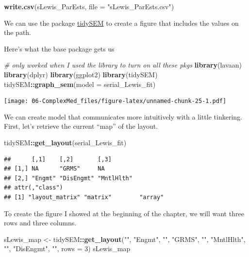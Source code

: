 \documentclass[
  11pt,
]{book}
\newenvironment{Shaded}{\begin{snugshade}}{\end{snugshade}}
\newcommand{\AttributeTok}[1]{\textcolor[rgb]{0.27,0.27,0.27}{#1}}
\newcommand{\CommentTok}[1]{\textcolor[rgb]{0.37,0.37,0.37}{\textit{#1}}}
\newcommand{\DecValTok}[1]{\textcolor[rgb]{0.06,0.06,0.06}{#1}}
\newcommand{\FunctionTok}[1]{\textcolor[rgb]{0.27,0.27,0.27}{\textbf{#1}}}
\newcommand{\NormalTok}[1]{#1}
\newcommand{\OtherTok}[1]{\textcolor[rgb]{0.37,0.37,0.37}{#1}}
\newcommand{\SpecialCharTok}[1]{\textcolor[rgb]{0.43,0.43,0.43}{\textbf{#1}}}
\newcommand{\StringTok}[1]{\textcolor[rgb]{0.5,0.5,0.5}{#1}}
\begin{document}
\begin{Shaded}
\begin{Highlighting}[]
\FunctionTok{write.csv}\NormalTok{(sLewis\_ParEsts, }\AttributeTok{file =} \StringTok{"sLewis\_ParEsts.csv"}\NormalTok{)}
\end{Highlighting}
\end{Shaded}

We can use the package \href{https://cjvanlissa.github.io/tidySEM/articles/Plotting_graphs.html}{tidySEM} to create a figure that includes the values on the path.

Here's what the base package gets us

\begin{Shaded}
\begin{Highlighting}[]
\CommentTok{\# only worked when I used the library to turn on all these pkgs}
\FunctionTok{library}\NormalTok{(lavaan)}
\FunctionTok{library}\NormalTok{(dplyr)}
\FunctionTok{library}\NormalTok{(ggplot2)}
\FunctionTok{library}\NormalTok{(tidySEM)}
\NormalTok{tidySEM}\SpecialCharTok{::}\FunctionTok{graph\_sem}\NormalTok{(}\AttributeTok{model =}\NormalTok{ serial\_Lewis\_fit)}
\end{Highlighting}
\end{Shaded}

\texttt{[image: 06-ComplexMed\_files/figure-latex/unnamed-chunk-25-1.pdf]}

We can create model that communicates more intuitively with a little tinkering. First, let's retrieve the current ``map'' of the layout.

\begin{Shaded}
\begin{Highlighting}[]
\NormalTok{tidySEM}\SpecialCharTok{::}\FunctionTok{get\_layout}\NormalTok{(serial\_Lewis\_fit)}
\end{Highlighting}
\end{Shaded}

\begin{verbatim}
##      [,1]    [,2]       [,3]      
## [1,] NA      "GRMS"     NA        
## [2,] "Engmt" "DisEngmt" "MntlHlth"
## attr(,"class")
## [1] "layout_matrix" "matrix"        "array"
\end{verbatim}

To create the figure I showed at the beginning of the chapter, we will want three rows and three columns.

\begin{Shaded}
\begin{Highlighting}[]
\NormalTok{sLewis\_map }\OtherTok{\textless{}{-}}\NormalTok{ tidySEM}\SpecialCharTok{::}\FunctionTok{get\_layout}\NormalTok{(}\StringTok{""}\NormalTok{, }\StringTok{"Engmt"}\NormalTok{, }\StringTok{""}\NormalTok{, }\StringTok{"GRMS"}\NormalTok{, }\StringTok{""}\NormalTok{, }\StringTok{"MntlHlth"}\NormalTok{,}
    \StringTok{""}\NormalTok{, }\StringTok{"DisEngmt"}\NormalTok{, }\StringTok{""}\NormalTok{, }\AttributeTok{rows =} \DecValTok{3}\NormalTok{)}
\NormalTok{sLewis\_map}
\end{Highlighting}
\end{Shaded}
\end{document}
